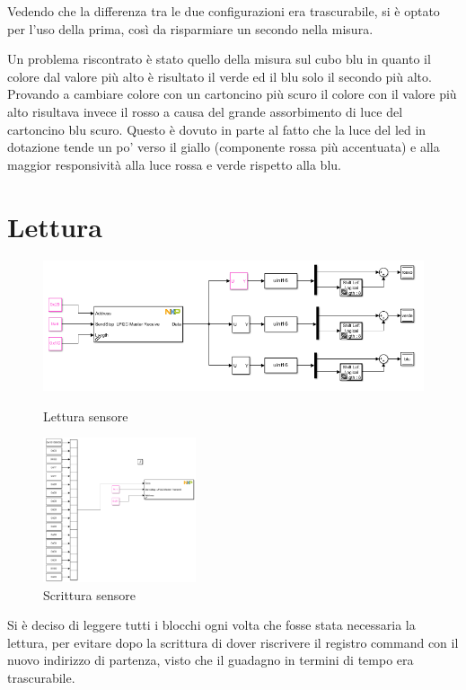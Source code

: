 \documentclass[12pt]{report}
\begin{document}
Vedendo che la differenza tra le due configurazioni era trascurabile, si è optato per l'uso della prima, così da risparmiare un secondo nella misura.

Un problema riscontrato è stato quello della misura sul cubo blu in quanto il colore dal valore più alto è risultato il verde ed il blu solo il secondo più alto. Provando a cambiare colore con un cartoncino più scuro il colore con il valore più alto risultava invece il rosso a causa del grande assorbimento di luce del cartoncino blu scuro. Questo è dovuto in parte al fatto che la luce del led in dotazione tende un po' verso il giallo (componente rossa più accentuata) e alla maggior responsività alla luce rossa e verde rispetto alla blu.

\section{Lettura}

\begin{figure}
    \includegraphics[width=\textwidth]{Immagini_sensore/lettura_sensore.png}
    \caption{Lettura sensore}
    \includegraphics[width=0.4\textwidth]{Immagini_sensore/scrittura_sensore.png}
    \caption{Scrittura sensore}
\end{figure}

Si è deciso di leggere tutti i blocchi ogni volta che fosse stata necessaria la lettura, per evitare dopo la scrittura di dover riscrivere il registro command con il nuovo indirizzo di partenza, visto che il guadagno in termini di tempo era trascurabile.
\end{document}
